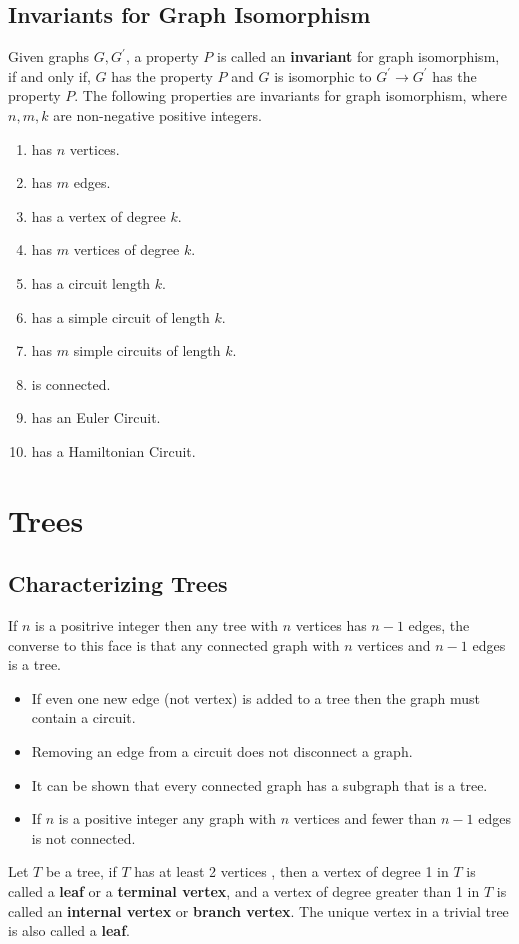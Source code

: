 \documentclass[a4paper]{article}
\begin{document}
  \subsection{Invariants for Graph Isomorphism}
  Given graphs $G,G^\prime$, a property $P$ is called an \textbf{invariant} for graph isomorphism, if and only if, $G$ has the property $P$ and $G$ is isomorphic to $G^\prime \rightarrow G^\prime$ has the property $P$. The following properties are invariants for graph isomorphism, where $n,m,k$ are non-negative positive integers.
  \begin{multicols}{2}
   \begin{enumerate}
    \item has $n$ vertices.
    \item has $m$ edges.
    \item has a vertex of degree $k$.
    \item has $m$ vertices of degree $k$.
    \item has a circuit length $k$.
    \item has a simple circuit of length $k$.
    \item has $m$ simple circuits of length $k$.
    \item is connected.
    \item has an Euler Circuit.
    \item has a Hamiltonian Circuit.
   \end{enumerate} 
  \end{multicols}
  \newpage
  \section{Trees} 
  \subsection{Characterizing Trees}
  If $n$ is a positrive integer then any tree with $n$ vertices has $n-1$ edges, the converse to this face is that any connected graph with $n$ vertices and $n-1$ edges is a tree.
  \begin{itemize}
    \item If even one new edge (not vertex) is added to a tree then the graph must contain a circuit.
    \item Removing an edge from a circuit does not disconnect a graph.
    \item It can be shown that every connected graph has a subgraph that is a tree.
    \item If $n$ is a positive integer any graph with $n$ vertices and fewer than $n-1$ edges is not connected.
  \end{itemize}
  Let $T$ be a tree, if $T$ has at least 2 vertices , then a vertex of degree 1 in $T$ is called a \textbf{leaf} or a \textbf{terminal vertex}, and a vertex of degree greater than 1 in $T$ is called an \textbf{internal vertex} or \textbf{branch vertex}. The unique vertex in a trivial tree is also called a \textbf{leaf}.
\end{document}
